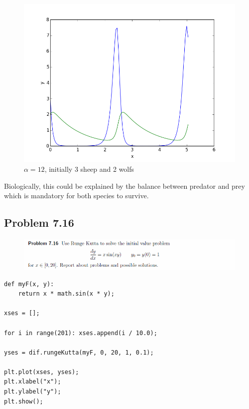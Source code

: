 \begin{figure}[!ht]
\includegraphics[width=1\textwidth]{chapters/images/figure-7-15-3}
\caption{$\alpha = 12$, initially 3 sheep and 2 wolfs}
\end{figure}

Biologically, this could be explained by the balance between predator and prey which is mandatory for both species to survive.


\newpage

\subsection{Problem 7.16}

\begin{figure}[!ht]
\includegraphics[width=1\textwidth]{chapters/images/desc-7-16}
\end{figure}

\begin{lstlisting}[caption=Problem 7.16]
def myF(x, y):
	return x * math.sin(x * y);

xses = [];

for i in range(201): xses.append(i / 10.0);

yses = dif.rungeKutta(myF, 0, 20, 1, 0.1);

plt.plot(xses, yses);
plt.xlabel("x");
plt.ylabel("y");
plt.show();
\end{lstlisting}

